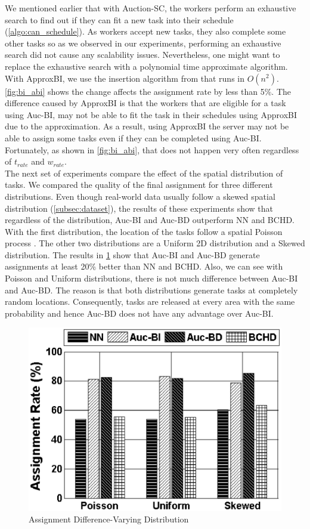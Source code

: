 We mentioned earlier that with Auction-SC, the workers perform an exhaustive search to find out if they can fit a new task into their schedule (\cref{algo:can_schedule}). As workers accept new tasks, they also complete some other tasks so as we observed in our experiments, performing an exhaustive search did not cause any scalability issues. Nevertheless, one might want to replace the exhaustive search with a polynomial time approximate algorithm. With ApproxBI, we use the insertion algorithm from \cite{Rosenkrantz74} that runs in $O(n^2)$. \cref{fig:bi_abi} shows the change affects the assignment rate by less than 5\%. The difference caused by ApproxBI is that the workers that are eligible for a task using Auc-BI, may not be able to fit the task in their schedules using ApproxBI due to the approximation. As a result, using ApproxBI the server may not be able to assign some tasks even if they can be completed using Auc-BI. Fortunately, as shown in \cref{fig:bi_abi}, that does not happen very often regardless of $t_{rate}$ and $w_{rate}$.\\

The next set of experiments compare the effect of the spatial distribution of tasks. We compared the quality of the final assignment for three different distributions. Even though real-world data usually follow a skewed spatial distribution (\cref{subsec:dataset}), the results of these experiments show that regardless of the distribution, Auc-BI and Auc-BD outperform NN and BCHD. With the first distribution, the location of the tasks follow a spatial Poisson process \cite{Baddeley07}. The other two distributions are a Uniform 2D distribution and a Skewed distribution. The results in \cref{fig:dists} show that Auc-BI and Auc-BD generate assignments at least 20\% better than NN and BCHD. Also, we can see with Poisson and Uniform distributions, there is not much difference between Auc-BI and Auc-BD. The reason is that both distributions generate tasks at completely random locations. Consequently, tasks are released at every area with the same probability and hence Auc-BD does not have any advantage over Auc-BI.\\

\begin{figure}[h]
	\centering
	\includegraphics[width=0.75\columnwidth]{figures/dists.eps}
	\vspace{-0.1in}
	\caption{Assignment Difference-Varying Distribution}\label{fig:dists}
\end{figure}

